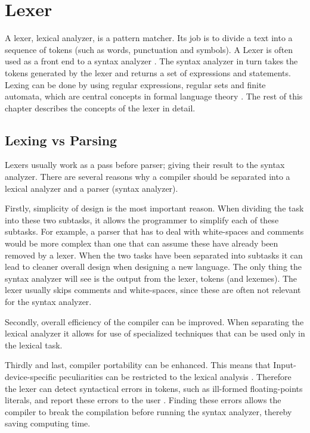 \chapter{Lexer}
A lexer, lexical analyzer, is a pattern matcher. Its job is to divide a text
into a sequence of tokens (such as words, punctuation and symbols). A Lexer is
often used as a front end to a syntax analyzer \cite{sebesta2012}. The syntax
analyzer in turn takes the tokens generated by the lexer and returns a set of
expressions and statements. Lexing can be done by using regular expressions,
regular sets and finite automata, which are central concepts in formal language
theory \cite{Aho1990}. The rest of this chapter describes the concepts of the
lexer in detail.

\section{Lexing vs Parsing}
Lexers usually work as a pass before parser; giving their result to the syntax
analyzer. There are several reasons why a compiler should be separated into a
lexical analyzer and a parser (syntax analyzer).

Firstly, simplicity of design is the most important reason. When dividing the task
into these two subtasks, it allows the programmer to simplify each of these
subtasks. For example, a parser that has to deal with white-spaces and comments
would be more complex than one that can assume these have already been removed
by a lexer. When the two tasks have been separated into subtasks it can lead to 
cleaner overall design when designing a new language. The only thing the syntax
analyzer will see is the output from the lexer, tokens (and lexemes). The lexer
usually skips comments and white-spaces, since these are often not relevant for
the syntax analyzer.

Secondly, overall efficiency of the compiler can be improved. When separating the 
lexical analyzer it allows for use of specialized techniques that can be used 
only in the lexical task.

Thirdly and last, compiler portability can be enhanced. This means that
Input-device-specific peculiarities can be restricted to the lexical analysis
\cite{Aho2006}. Therefore the lexer can detect syntactical errors in tokens,
such as ill-formed floating-points literals, and report these errors to the user
\cite{sebesta2012}. Finding these errors allows the compiler to break the
compilation before running the syntax analyzer, thereby saving computing time.

